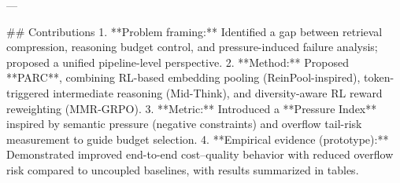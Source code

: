 ---

## Contributions  
1. **Problem framing:** Identified a gap between retrieval compression, reasoning budget control, and pressure-induced failure analysis; proposed a unified pipeline-level perspective.  
2. **Method:** Proposed **PARC**, combining RL-based embedding pooling (ReinPool-inspired), token-triggered intermediate reasoning (Mid-Think), and diversity-aware RL reward reweighting (MMR-GRPO).  
3. **Metric:** Introduced a **Pressure Index** inspired by semantic pressure (negative constraints) and overflow tail-risk measurement to guide budget selection.  
4. **Empirical evidence (prototype):** Demonstrated improved end-to-end cost–quality behavior with reduced overflow risk compared to uncoupled baselines, with results summarized in tables.